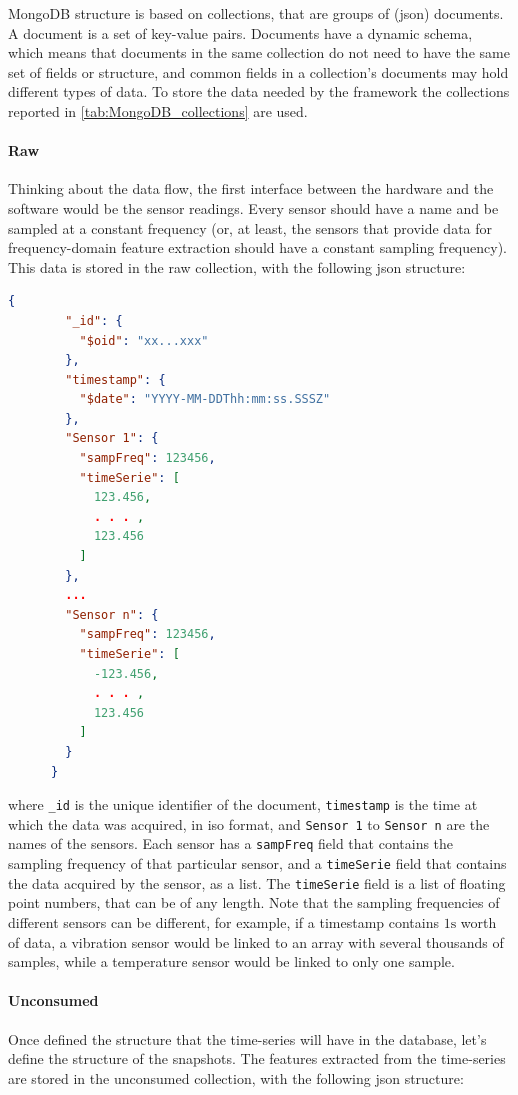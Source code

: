 MongoDB structure is based on collections, that are groups of (\gls{json}) documents. A document is a set of key-value pairs. Documents have a dynamic schema, which means that documents in the same collection do not need to have the same set of fields or structure, and common fields in a collection's documents may hold different types of data. To store the data needed by the framework the collections reported in \autoref{tab:MongoDB_collections} are used.

\paragraph{Raw}
Thinking about the data flow, the first interface between the hardware and the software would be the sensor readings. Every sensor should have a name and be sampled at a constant frequency (or, at least, the sensors that provide data for frequency-domain feature extraction should have a constant sampling frequency). This data is stored in the {raw} collection, with the following \gls{json} structure:
\begin{lstlisting}[language=json,firstnumber=1]
    {
        "_id": {
          "$oid": "xx...xxx"
        },
        "timestamp": {
          "$date": "YYYY-MM-DDThh:mm:ss.SSSZ"
        },
        "Sensor 1": {
          "sampFreq": 123456,
          "timeSerie": [
            123.456,
            . . . ,
            123.456
          ]
        },
        ...
        "Sensor n": {
          "sampFreq": 123456,
          "timeSerie": [
            -123.456,
            . . . ,
            123.456
          ]
        }
      }
\end{lstlisting}
where \texttt{\_id} is the unique identifier of the document, \texttt{timestamp} is the time at which the data was acquired, in \gls{iso} format, and \texttt{Sensor 1} to \texttt{Sensor n} are the names of the sensors. Each sensor has a \texttt{sampFreq} field that contains the sampling frequency of that particular sensor, and a \texttt{timeSerie} field that contains the data acquired by the sensor, as a list. The \texttt{timeSerie} field is a list of floating point numbers, that can be of any length. Note that the sampling frequencies of different sensors can be different, for example, if a timestamp contains $1\si{\s}$ worth of data, a vibration sensor would be linked to an array with several thousands of samples, while a temperature sensor would be linked to only one sample.

\paragraph{Unconsumed}
Once defined the structure that the time-series will have in the database, let's define the structure of the snapshots. The features extracted from the time-series are stored in the {unconsumed} collection, with the following \gls{json} structure:

